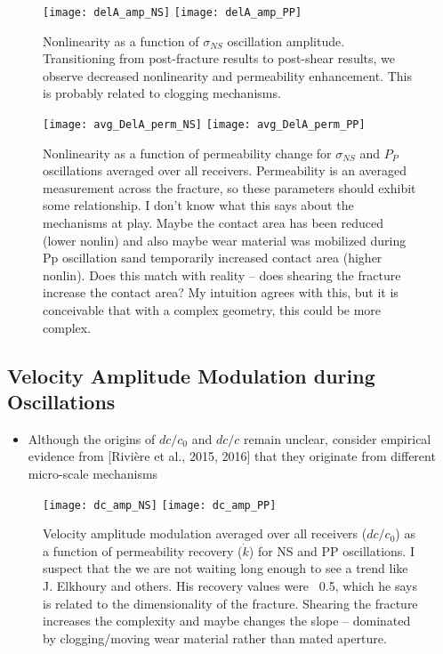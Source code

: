 \begin{figure}[ht]
	\centering
	\texttt{[image: delA\_amp\_NS]}
	\texttt{[image: delA\_amp\_PP]}
	\caption{Nonlinearity as a function of $ \sigma_{NS} $ oscillation amplitude. Transitioning from post-fracture results to post-shear results, we observe decreased nonlinearity and permeability enhancement. This is probably related to clogging mechanisms.}%
	\label{fig:delA_ns_amp}
\end{figure}

\newpage


\begin{figure}[ht]
	\centering
	\texttt{[image: avg\_DelA\_perm\_NS]}
	\texttt{[image: avg\_DelA\_perm\_PP]}
	\caption{Nonlinearity as a function of permeability change for $ \sigma_{NS} $ and $ P_P $ oscillations averaged over all receivers. Permeability is an averaged measurement across the fracture, so these parameters should exhibit some relationship. I don’t know what this says about the mechanisms at play. Maybe the contact area has been reduced (lower nonlin) and also maybe wear material was mobilized during Pp oscillation sand temporarily increased contact area (higher nonlin). Does this match with reality -- does shearing the fracture increase the contact area? My intuition agrees with this, but it is conceivable that with a complex geometry, this could be more complex.}
	\label{fig:dela_plots2}
\end{figure}

\newpage

\subsection{Velocity Amplitude Modulation during Oscillations}




\begin{itemize}
	\item Although the origins of $dc/c_0 $ and $ dc/c $ remain unclear, consider empirical evidence from [Rivière et al., 2015, 2016] that they originate from different micro-scale mechanisms 
\end{itemize}


\begin{figure}[ht]
	\centering
	\texttt{[image: dc\_amp\_NS]}
	\texttt{[image: dc\_amp\_PP]}
	\caption{Velocity amplitude modulation averaged over all receivers ($ dc/c_0 $) as a function of permeability recovery ($ \dot k $) for NS and PP oscillations. 
		I suspect that the we are not waiting long enough to see a trend like J. Elkhoury and others. His recovery values were ~0.5, which he says is related to the dimensionality of the fracture. Shearing the fracture increases the complexity and maybe changes the slope -- dominated by clogging/moving wear material rather than mated aperture.}
	\label{fig:dc_plots2}
\end{figure}

